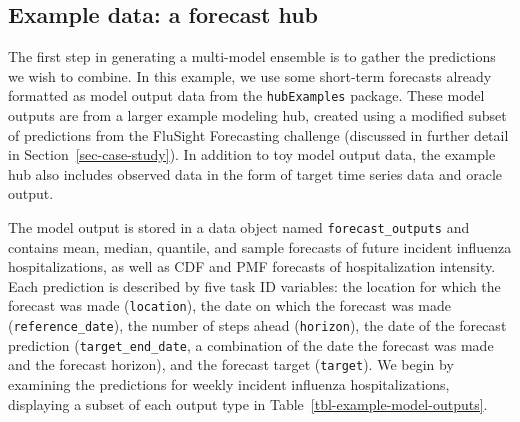 \documentclass[
  letterpaper,
  DIV=11,
  numbers=noendperiod]{scrartcl}
\begin{document}
\subsection{Example data: a forecast
hub}\label{example-data-a-forecast-hub}

The first step in generating a multi-model ensemble is to gather the
predictions we wish to combine. In this example, we use some short-term
forecasts already formatted as model output data from the
\texttt{hubExamples} package. These model outputs are from a larger
example modeling hub, created using a modified subset of predictions
from the FluSight Forecasting challenge (discussed in further detail in
Section~\ref{sec-case-study}). In addition to toy model output data, the
example hub also includes observed data in the form of target time
series data and oracle output.

The model output is stored in a data object named
\texttt{forecast\_outputs} and contains mean, median, quantile, and
sample forecasts of future incident influenza hospitalizations, as well
as CDF and PMF forecasts of hospitalization intensity. Each prediction
is described by five task ID variables: the location for which the
forecast was made (\texttt{location}), the date on which the forecast
was made (\texttt{reference\_date}), the number of steps ahead
(\texttt{horizon}), the date of the forecast prediction
(\texttt{target\_end\_date}, a combination of the date the forecast was
made and the forecast horizon), and the forecast target
(\texttt{target}). We begin by examining the predictions for weekly
incident influenza hospitalizations, displaying a subset of each output
type in Table~\ref{tbl-example-model-outputs}.
\end{document}
